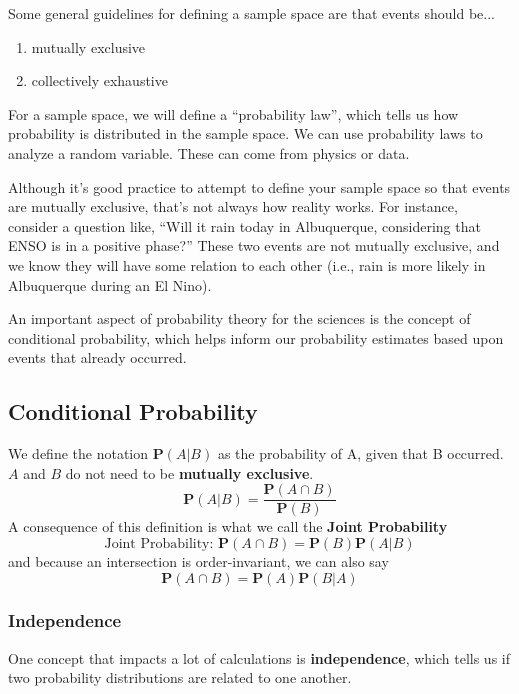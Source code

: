 \documentclass{article}
\begin{document}
Some general guidelines for defining a sample space are that events should be... 
\begin{enumerate}
\item\label{item:1} mutually exclusive
\item collectively exhaustive 
\end{enumerate}

For a sample space, we will define a ``probability law'', which tells us how probability is distributed in the sample space. We can use probability laws to analyze a random variable. These can come from physics or data.

Although it's good practice to attempt to define your sample space so that events are mutually exclusive, that's not always how reality works. For instance, consider a question like, ``Will it rain today in Albuquerque, considering that ENSO is in a positive phase?'' These two events are not mutually exclusive, and we know they will have some relation to each other (i.e., rain is more likely in Albuquerque during an El Nino). 

An important aspect of probability theory for the sciences is the concept of conditional probability, which helps inform our probability estimates based upon events that already occurred. 

\subsection{Conditional Probability}
We define the notation $\mathbf{P}(A|B)$ as the probability of A, given that B occurred. $A$ and $B$ do not need to be \textbf{mutually exclusive}. 
\begin{equation}
\label{eq:6}
\mathbf{P}(A|B) = \frac{\mathbf{P}(A \cap B)}{\mathbf{P}(B)}
\end{equation}
A consequence of this definition is what we call the \textbf{Joint Probability}
\begin{equation}
\label{eq:7}
\text{Joint Probability: }\mathbf{P}(A \cap B) = \mathbf{P}(B) \mathbf{P} (A|B)
\end{equation}
and because an intersection is order-invariant, we can also say 
\begin{equation}
\label{eq:11}
\mathbf{P}(A \cap B) = \mathbf{P}(A) \mathbf{P} (B|A)
\end{equation}

\subsubsection{Independence}
One concept that impacts a lot of calculations is \textbf{independence}, which tells us if two probability distributions are related to one another.
\end{document}
